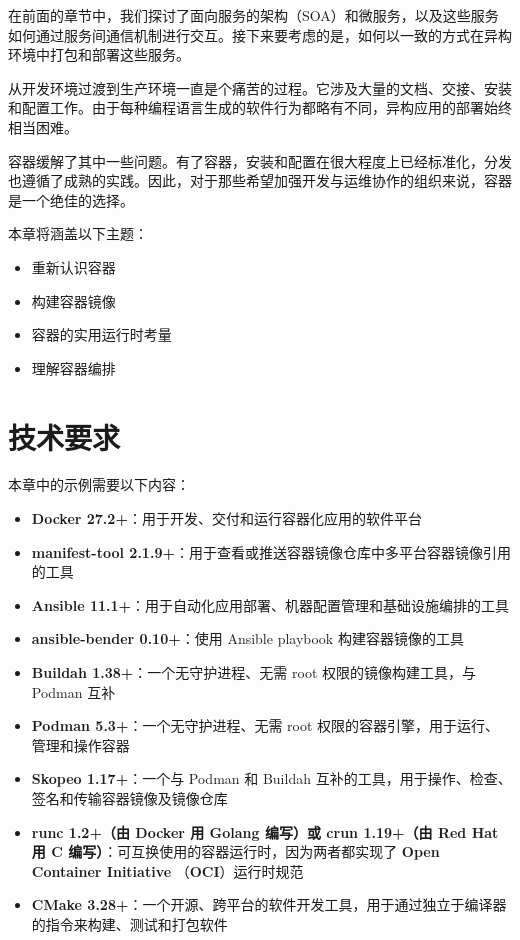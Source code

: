 在前面的章节中，我们探讨了面向服务的架构（SOA）和微服务，以及这些服务如何通过服务间通信机制进行交互。接下来要考虑的是，如何以一致的方式在异构环境中打包和部署这些服务。

从开发环境过渡到生产环境一直是个痛苦的过程。它涉及大量的文档、交接、安装和配置工作。由于每种编程语言生成的软件行为都略有不同，异构应用的部署始终相当困难。

容器缓解了其中一些问题。有了容器，安装和配置在很大程度上已经标准化，分发也遵循了成熟的实践。因此，对于那些希望加强开发与运维协作的组织来说，容器是一个绝佳的选择。

本章将涵盖以下主题：

\begin{itemize}
\item 重新认识容器
\item 构建容器镜像
\item 容器的实用运行时考量
\item 理解容器编排
\end{itemize}

\section{技术要求}

本章中的示例需要以下内容：

\begin{itemize}
\item \textbf{Docker 27.2+}：用于开发、交付和运行容器化应用的软件平台
\item \textbf{manifest-tool 2.1.9+}：用于查看或推送容器镜像仓库中多平台容器镜像引用的工具
\item \textbf{Ansible 11.1+}：用于自动化应用部署、机器配置管理和基础设施编排的工具
\item \textbf{ansible-bender 0.10+}：使用 Ansible playbook 构建容器镜像的工具
\item \textbf{Buildah 1.38+}：一个无守护进程、无需 root 权限的镜像构建工具，与 Podman 互补
\item \textbf{Podman 5.3+}：一个无守护进程、无需 root 权限的容器引擎，用于运行、管理和操作容器
\item \textbf{Skopeo 1.17+}：一个与 Podman 和 Buildah 互补的工具，用于操作、检查、签名和传输容器镜像及镜像仓库
\item \textbf{runc 1.2+（由 Docker 用 Golang 编写）或 crun 1.19+（由 Red Hat 用 C 编写）}：可互换使用的容器运行时，因为两者都实现了 \textbf{Open Container Initiative }（\textbf{OCI}）运行时规范
\item \textbf{CMake 3.28+}：一个开源、跨平台的软件开发工具，用于通过独立于编译器的指令来构建、测试和打包软件
\end{itemize}

